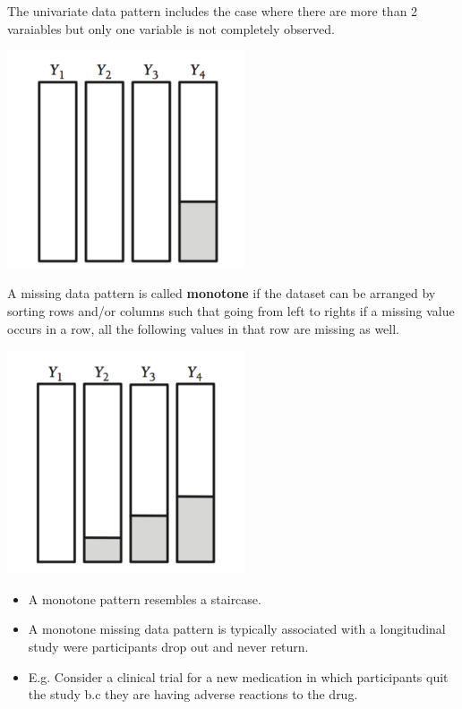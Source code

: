 \documentclass[11pt]{article}
\theoremstyle{break}
\begin{document}
\begin{definition}
The univariate data pattern includes the case where there are more than 2
varaiables but only one variable is not completely observed.

\end{definition}

\includegraphics[width=7cm]{1.png}

\begin{definition}
    A missing data pattern is called \textbf{monotone} if the dataset can be arranged by
sorting rows and/or columns such that going from left to rights if a missing
value occurs in a row, all the following values in that row are missing as
well.
\end{definition}

\includegraphics[width=7cm]{2.png}

\begin{itemize}
    \item A monotone pattern resembles a staircase. 
    \item A monotone missing data pattern is typically associated with a
        longitudinal study were participants drop out and never return.
    \item E.g. Consider a clinical trial for a new medication in which
        participants quit the study b.c they are having adverse reactions to
        the drug.
\end{itemize}
\end{document}
